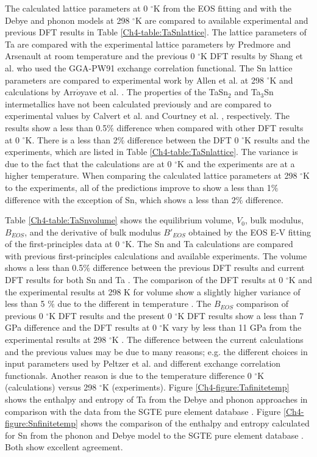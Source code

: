 The calculated lattice parameters at 0 $^\circ$K from the EOS fitting and with the Debye and phonon models at 298 $^\circ$K are compared to available experimental and previous DFT results in Table \ref{Ch4-table:TaSnlattice}. The lattice parameters of Ta are compared with the experimental lattice parameters by Predmore and Arsenault \cite{Predmore1970} at room temperature and the previous 0 $^\circ$K DFT results by Shang et al. \cite{Shang2010b} who used the GGA-PW91 exchange correlation functional. The Sn lattice parameters are compared to experimental work by Allen et al. \cite{Allen1991} at 298 $^\circ$K and calculations by Arr$\acute{o}$yave et al. \cite{Arroyave2006a}. The properties of the TaSn$_2$ and Ta$_3$Sn intermetallics have not been calculated previously and are compared to experimental values by Calvert et al. \cite{Calvert1991} and Courtney et al. \cite{Courtney1965}, respectively. The results show a less than 0.5$\%$ difference when compared with other DFT results at 0 $^\circ$K. There is a less than 2$\%$ difference between the DFT 0 $^\circ$K results and the experiments, which are listed in Table \ref{Ch4-table:TaSnlattice}. The variance is due to the fact that the calculations are at 0 $^\circ$K and the experiments are at a higher temperature. When comparing the calculated lattice parameters at 298 $^\circ$K to the experiments, all of the predictions improve to show a less than 1$\%$ difference with the exception of Sn, which shows a less than 2$\%$ difference. 

Table \ref{Ch4-table:TaSnvolume} shows the equilibrium volume, $V_{0}$, bulk modulus, $B_{EOS}$, and the derivative of bulk modulus $B'_{EOS}$ obtained by the EOS E-V fitting of the first-principles data at 0 $^\circ$K.  The Sn and Ta calculations are compared with previous first-principles calculations and available experiments. The volume shows a less than 0.5$\%$ difference between the previous DFT results and current DFT results for both Sn and Ta \cite{Predmore1970,PeltzeryBlanca1993a}. The comparison of the DFT results at 0 $^\circ$K and the experimental results at 298 K for volume show a slightly higher variance of less than 5 $\%$ due to the different in temperature \cite{Shang2010b,PeltzeryBlanca1993a}. The $B_{EOS}$ comparison of previous 0 $^\circ$K DFT results and the present 0 $^\circ$K DFT results show a less than 7 GPa difference and the DFT results at 0 $^\circ$K vary by less than 11 GPa from the experimental results at 298 $^\circ$K \cite{Predmore1970,Shang2010b,PeltzeryBlanca1993a}. The difference between the current calculations and the previous values may be due to many reasons; e.g. the different choices in input parameters used by Peltzer et al. \cite{PeltzeryBlanca1993a} and different exchange correlation functionals. Another reason is due to the temperature difference 0 $^\circ$K (calculations) versus 298 $^\circ$K (experiments). Figure \ref{Ch4-figure:Tafinitetemp} shows the enthalpy and entropy of Ta from the Debye and phonon approaches in comparison with the data from the SGTE pure element database \cite{Dinsdale1991}. Figure \ref{Ch4-figure:Snfinitetemp} shows the comparison of the enthalpy and entropy calculated for Sn from the phonon and Debye model to the SGTE pure element database \cite{Dinsdale1991}. Both show excellent agreement.

